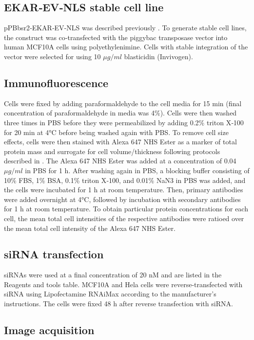 \subsection{EKAR‐EV‐NLS stable cell line}

pPBbsr2‐EKAR‐EV‐NLS was described previously \cite{Komatsu2011}. To generate stable cell lines, the construct was co‐transfected with the piggybac transposase vector into human MCF10A cells using polyethylenimine. Cells with stable integration of the vector were selected for using 10 $\mu g/ml$ blasticidin (Invivogen).

\subsection{Immunofluorescence}

Cells were fixed by adding paraformaldehyde to the cell media for 15 min (final concentration of paraformaldehyde in media was 4\%). Cells were then washed three times in PBS before they were permeabilized by adding 0.2\% triton X‐100 for 20 min at 4\si{\degree}C before being washed again with PBS. To remove cell size effects, cells were then stained with Alexa 647 NHS Ester as a marker of total protein mass and surrogate for cell volume/thickness following protocols described in \cite{Kafri2013}. The Alexa 647 NHS Ester was added at a concentration of 0.04 $\mu g/ml$ in PBS for 1 h. After washing again in PBS, a blocking buffer consisting of 10\% FBS, 1\% BSA, 0.1\% triton X‐100, and 0.01\% NaN3 in PBS was added, and the cells were incubated for 1 h at room temperature. Then, primary antibodies were added overnight at 4\si{\degree}C, followed by incubation with secondary antibodies for 1 h at room temperature. To obtain particular protein concentrations for each cell, the mean total cell intensities of the respective antibodies were ratioed over the mean total cell intensity of the Alexa 647 NHS Ester.

\subsection{siRNA transfection}

siRNAs were used at a final concentration of 20 nM and are listed in the Reagents and tools table. MCF10A and Hela cells were reverse‐transfected with siRNA using Lipofectamine RNAiMax according to the manufacturer's instructions. The cells were fixed 48 h after reverse transfection with siRNA.

\subsection{Image acquisition}

